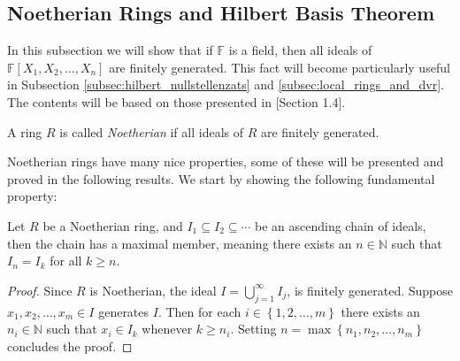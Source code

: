 \subsection{Noetherian Rings and Hilbert Basis Theorem}%
In this subsection we will show that if $\mathbb{F}$ is a field, then all ideals of $\mathbb{F}[X_1, X_2, \ldots, X_{n}]$ are finitely generated. This fact will become particularly useful in Subsection \ref{subsec:hilbert_nullstellenzats} and \ref{subsec:local_rings_and_dvr}. The contents will be based on those presented in \cite{Fulton}[Section 1.4].
\begin{definition}
  A ring $R$ is called \textit{Noetherian} if all ideals of $R$ are finitely generated.
\end{definition}

Noetherian rings have many nice properties, some of these will be presented and proved in the following results. We start by showing the following fundamental property:

\begin{proposition}\label{prop:noetherian_chain_of_ideals_have_maximal_member}
  Let $R$ be a Noetherian ring, and $I_1 \subseteq I_2 \subseteq \cdots$ be an ascending chain of ideals, then the chain has a maximal member, meaning there exists an $n \in \mathbb{N}$ such that $I_{n} = I_{k}$ for all $k \geq n$.
\end{proposition}
\begin{proof}
  Since $R$ is Noetherian, the ideal $I = \bigcup_{j = 1}^{\infty} I_{j}$, is finitely generated. Suppose $x_1, x_2, \ldots, x_{m} \in I$ generates $I$. Then for each $i \in \left\{1, 2, \ldots, m\right\}$ there exists an $n_{i} \in \mathbb{N}$ such that $x_{i} \in I_{k}$ whenever $k \geq n_{i}$. Setting $n = \max \left\{n_1, n_2, \ldots, n_{m}\right\}$ concludes the proof.
\end{proof}

